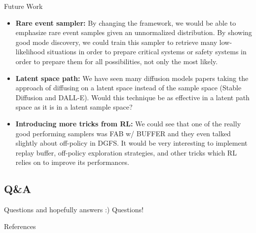 \documentclass[aspectratio=169,xcolor=dvipsnames]{beamer}
\begin{document}
\begin{frame}{Future Work}
\footnotesize


\begin{itemize}\itemsep2pt
  \item \textbf{Rare event sampler:} By changing the framework, we would be able to emphasize rare event samples given an unnormalized distribution. By showing good mode discovery, we could train this sampler to retrieve many low-likelihood situations in order to prepare critical systems or safety systems in order to prepare them for all possibilities, not only the most likely.
  \item \textbf{Latent space path:} We have seen many diffusion models papers taking the approach of diffusing on a latent space instead of the sample space (Stable Diffusion and DALL-E). Would this technique be as effective in a latent path space as it is in a latent sample space?
  \item \textbf{Introducing more tricks from RL:} We could see that one of the really good performing samplers was FAB w/ BUFFER and they even talked slightly about off-policy in DGFS. It would be very interesting to implement replay buffer, off-policy exploration strategies, and other tricks which RL relies on to improve its performances.
\end{itemize}

\end{frame}

\subsection{Q\&A}

\begin{frame}{Questions and hopefully answers :)}
    \centering
    \Huge Questions!
\end{frame}

\begin{frame}[allowframebreaks]{References}
\footnotesize
\printbibliography
\end{frame}
\end{document}
